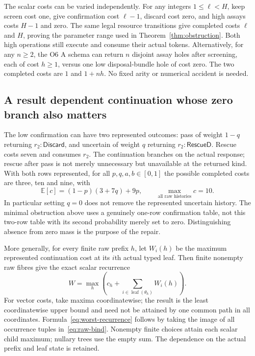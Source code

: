 \documentclass[11pt,a4paper]{article}
\theoremstyle{definition}
\newcommand{\leaf}{\operatorname{leaf}}
\begin{document}
The scalar costs can be varied independently. For any integers
$1\leq\ell<H$, keep screen cost one, give confirmation cost $\ell-1$,
discard cost zero, and high assays costs $H-1$ and zero. The same legal
resource transitions give completed costs $\ell$ and $H$, proving the
parameter range used in Theorem~\ref{thm:obstruction}. Both high
operations still execute and consume their actual tokens. Alternatively,
for any $n\geq2$, the O6 A schema can return $n$ disjoint assay holes
after screening, each of cost $h\geq1$, versus one low disposal-bundle
hole of cost zero. The two completed costs are $1$ and $1+nh$. No fixed
arity or numerical accident is needed.

\subsection{A result dependent continuation whose zero branch also matters}
The low confirmation can have two represented outcomes: pass of weight
$1-q$ returning $r_2:\mathsf{Discard}$, and uncertain of weight $q$
returning $r_2:\mathsf{RescueD}$. Rescue costs seven and consumes $r_2$.
The continuation branches on the actual response; rescue after pass is
not merely unnecessary but unavailable at the returned kind. With both
rows represented, for all $p,q,a,b\in[0,1]$ the possible completed costs
are three, ten and nine, with
\begin{equation}\label{eq:app-costs}
 \mathbb E[c]=(1-p)(3+7q)+9p,
 \qquad \max_{\text{all raw histories}}c=10.
\end{equation}
In particular setting $q=0$ does not remove the represented uncertain
history. The minimal obstruction above uses a genuinely one-row
confirmation table, not this two-row table with its second probability
merely set to zero. Distinguishing absence from zero mass is the purpose
of the repair.

More generally, for every finite raw prefix $h$, let $W_i(h)$ be the
maximum represented continuation cost at its $i$th actual typed leaf.
Then finite nonempty raw fibres give the exact scalar recurrence
\begin{equation}\label{eq:worst-recurrence}
 W=\max_h\left(c_h+\sum_{i\in\leaf(\theta_h)}W_i(h)\right).
\end{equation}
For vector costs, take maxima coordinatewise; the result is the least
coordinatewise upper bound and need not be attained by one common path
in all coordinates. Formula~\eqref{eq:worst-recurrence} follows by taking
the image of all occurrence tuples in~\eqref{eq:raw-bind}. Nonempty finite
choices attain each scalar child maximum; nullary trees use the empty
sum. The dependence on the actual prefix and leaf state is retained.
\end{document}
